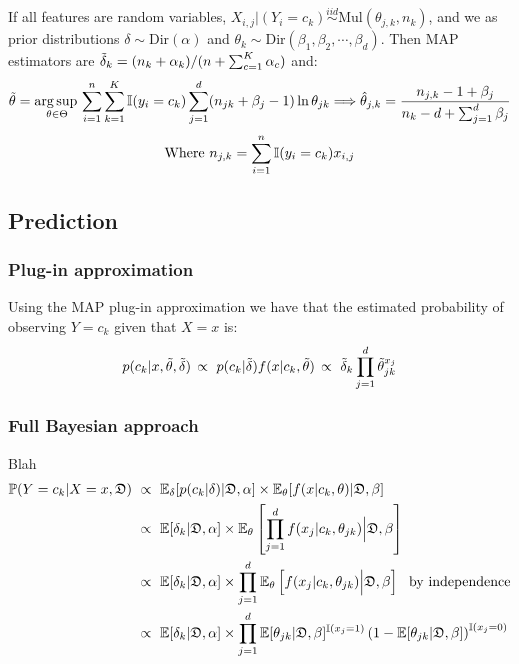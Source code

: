 If all features are  random variables, $X_{i,j}|(Y_i=c_k)\overset{iid}{\sim}\text{Mul}(\theta_{j,k},n_k)$, and we as prior distributions $\delta\sim\text{Dir}(\alpha)$ and $\theta_k\sim\text{Dir}(\beta_1,\beta_2,\cdots,\beta_d)$. Then MAP estimators are $\Tilde{\delta}_k = (n_k+\alpha_k)/(n+\sum_{c=1}^K\alpha_c)$ and:
\begin{equation*}
    \Tilde{\theta} = \operatorname*{arg\,sup\,}_{\theta\in\Theta}  \sum_{i=1}^n\sum_{k=1}^K\operatorname{\mathbb{I}}(y_i=c_k)\sum_{j=1}^d(n_{jk}+\beta_j-1)\ln \theta_{jk} \Longrightarrow \hat{\theta}_{j,k} = \frac{n_{j,k}-1+\beta_j}{n_k-d+\sum_{j=1}^d\beta_j}
\end{equation*}
\begin{equation*}
    \text{Where } n_{j,k}=\sum_{i=1}^n\operatorname{\mathbb{I}}(y_i=c_k)x_{i,j}
\end{equation*}

\subsection{Prediction}

\subsubsection*{Plug-in approximation}
Using the MAP plug-in approximation we have that the estimated probability of observing $Y=c_k$ given that $X=x$ is:
\begin{equation*}
    p(c_k|x, \Tilde{\theta},\Tilde{\delta})\, \propto\ p(c_k|\Tilde{\delta})f(x|c_k,\Tilde{\theta})\, \propto\  \Tilde{\delta}_k\prod_{j=1}^d \Tilde{\theta}_{jk}^{x_j}
\end{equation*}


\subsubsection*{Full Bayesian approach}

Blah
\begin{align*}
    \operatorname{\mathbb{P}}(Y=c_k|X =x,\mathfrak{D})\
    &\propto\ \operatorname{\mathbb{E}}_{\delta}[p(c_k|\delta)|\mathfrak{D},\alpha]\times \operatorname{\mathbb{E}}_{\theta}[f(x|c_k,\theta)|\mathfrak{D},\beta] \\
    &\propto\ \operatorname{\mathbb{E}} [\delta_k|\mathfrak{D},\alpha] \times \operatorname{\mathbb{E}}_{\theta}\left[\prod_{j=1}^d  f(x_j|c_k,\theta_{jk}) \Big|\mathfrak{D},\beta\right]\\
    &\propto\ \operatorname{\mathbb{E}} [\delta_k|\mathfrak{D},\alpha] \times \prod_{j=1}^d\operatorname{\mathbb{E}}_{\theta}\left[  f(x_j|c_k,\theta_{jk}) \Big|\mathfrak{D},\beta\right]\ \text{ by independence} \\
    &\propto\ \operatorname{\mathbb{E}} [\delta_k|\mathfrak{D},\alpha]\times\prod_{j=1}^d \operatorname{\mathbb{E}} [\theta_{jk}|\mathfrak{D},\beta]^{\operatorname{\mathbb{I}}(x_j=1)}\left(1-\operatorname{\mathbb{E}} [\theta_{jk}|\mathfrak{D},\beta]\right)^{\operatorname{\mathbb{I}}(x_j=0)}
\end{align*}











